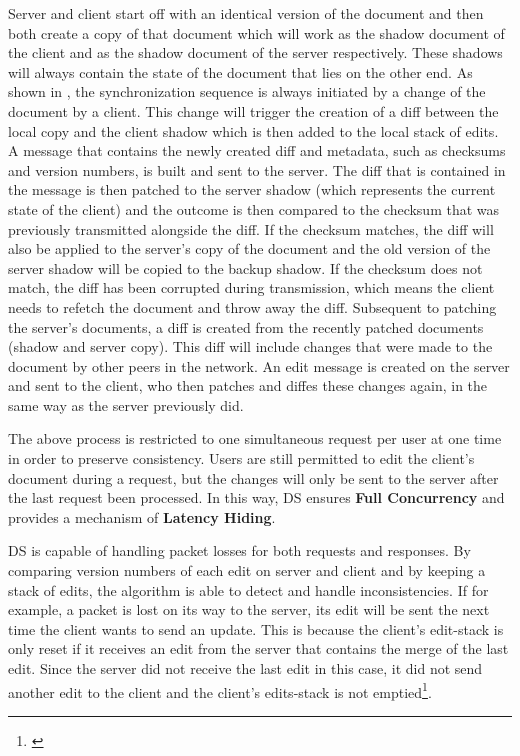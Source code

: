 Server and client start off with an identical version of the document and then both create a copy of that document which will work as the shadow document of the client and as the shadow document of the server respectively. These shadows will always contain the state of the document that lies on the other end. As shown in , the synchronization sequence is always initiated by a change of the document by a client. This change will trigger the creation of a diff between the local copy and the client shadow which is then added to the local stack of edits. A message that contains the newly created diff and metadata, such as checksums and version numbers, is built and sent to the server. The diff that is contained in the message is then patched to the server shadow (which represents the current state of the client) and the outcome is then compared to the checksum that was previously transmitted alongside the diff. If the checksum matches, the diff will also be applied to the server's copy of the document and the old version of the server shadow will be copied to the backup shadow. If the checksum does not match, the diff has been corrupted during transmission, which means the client needs to refetch the document and throw away the diff. Subsequent to patching the server's documents, a diff is created from the recently patched documents (shadow and server copy). This diff will include changes that were made to the document by other peers in the network. An edit message is created on the server and sent to the client, who then patches and diffes these changes again, in the same way as the server previously did.

The above process is restricted to one simultaneous request per user at one time in order to preserve consistency. Users are still permitted to edit the client's document during a request, but the changes will only be sent to the server after the last request been processed. In this way, DS ensures \textbf{Full Concurrency} and provides a mechanism of \textbf{Latency Hiding}.

DS is capable of handling packet losses for both requests and responses. By comparing version numbers of each edit on server and client and by keeping a stack of edits, the algorithm is able to detect and handle inconsistencies. If for example, a packet is lost on its way to the server, its edit will be sent the next time the client wants to send an update. This is because the client's edit-stack is only reset if it receives an edit from the server that contains the merge of the last edit. Since the server did not receive the last edit in this case, it did not send another edit to the client and the client's edits-stack is not emptied\footnote{\cite[p. 4]{fraser2009differential}}.


